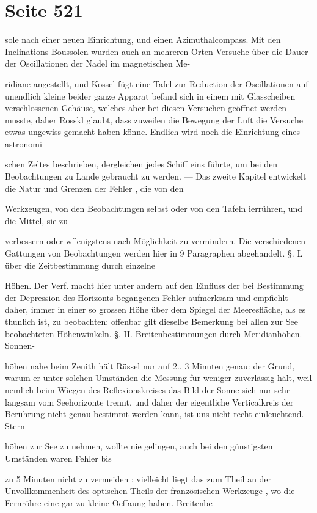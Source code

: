 \documentclass[10pt,a4paper]{article}
\begin{document}
\newpage
\section*{Seite 521}
sole nach einer neuen Einrichtung, und einen Azimuthalcompass. Mit den Inclinations-Boussolen wurden auch an mehreren Orten Versuche über die Dauer der Oscillationen der Nadel im magnetischen Me-

ridiane angestellt, und Kossel fügt eine Tafel zur Reduction der Oscillationen auf unendlich kleine beider ganze Apparat befand sich in einem mit Glasscheiben verschlossenen Gehäuse, welches aber bei diesen Versuchen geöffnet werden musste, daher Rosskl glaubt, dass zuweilen die Bewegung der Luft die Versuche etwas ungewiss gemacht haben könne. Endlich wird noch die Einrichtung eines astronomi-

schen Zeltes beschrieben, dergleichen jedes Schiff eins führte, um bei den Beobachtungen zu Lande gebraucht zu werden. — Das zweite Kapitel entwickelt die Natur und Grenzen der Fehler , die von den

Werkzeugen, von den Beobachtungen selbst oder von den Tafeln ierrühren, und die Mittel, sie zu

verbessern oder w\textasciicircum{}enigstens nach Möglichkeit zu vermindern. Die verschiedenen Gattungen von Beobachtungen werden hier in 9 Paragraphen abgehandelt. §. L über die Zeitbestimmung durch einzelne

Höhen. Der Verf. macht hier unter andern auf den Einfluss der bei Bestimmung der Depression des Horizonts begangenen Fehler aufmerksam und empfiehlt daher, immer in einer so grossen Höhe über dem Spiegel der Meeresfläche, als es thunlich ist, zu beobachten: offenbar gilt dieselbe Bemerkung bei allen zur See beobachteten Höhenwinkeln. §. II. Breitenbestimmungen durch Meridianhöhen. Sonnen-

höhen nahe beim Zenith hält Rüssel nur auf 2.. 3 Minuten genau: der Grund, warum er unter solchen Umständen die Messung für weniger zuverlässig hält, weil nemlich beim Wiegen des Reflexionskreises das Bild der Sonne sich nur sehr langsam vom Seehorizonte trennt, und daher der eigentliche Verticalkreis der Berührung nicht genau bestimmt werden kann, ist uns nicht recht einleuchtend. Stern-

höhen zur See zu nehmen, wollte nie gelingen, auch bei den günstigsten Umständen waren Fehler bis

zu 5 Minuten nicht zu vermeiden : vielleicht liegt das zum Theil an der Unvollkommenheit des optischen Theils der französischen Werkzeuge , wo die Fernröhre eine gar zu kleine Oeffaung haben. Breitenbe-
\end{document}
